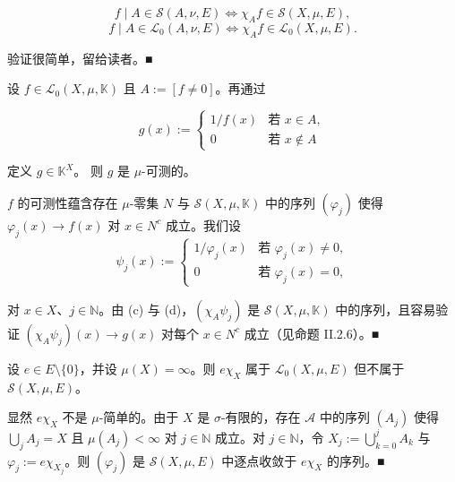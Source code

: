 \begin{remark}
\begin{items}
\[
f \mid A \in \mathcal{S}(A,\nu,E) \iff \chi_A f \in \mathcal{S}(X,\mu,E) ,
\]
\[
f \mid A \in \mathcal{L}_0(A,\nu,E) \iff \chi_A f \in \mathcal{L}_0(X,\mu,E) .
\]

\proofhead
验证很简单，留给读者。\nobreak\hspace{0.35em}■
\item

设 $ f \in \mathcal{L}_0(X,\mu,\mathbb{K}) $ 且 $ A := [f \neq 0] $。再通过

\begin{equation*}
g(x) := \begin{cases} 1/f(x) & \text{若 } x \in A , \\ 0 & \text{若 } x \notin A \end{cases}
\end{equation*}

定义 $ g \in \mathbb{K}^X $。
则 $ g $ 是 $ \mu $-可测的。

\proofhead
$ f $ 的可测性蕴含存在 $ \mu $-零集 $ N $ 与 $ \mathcal{S}(X,\mu,\mathbb{K}) $ 中的序列 $ (\varphi_j) $ 使得 $ \varphi_j(x) \to f(x) $ 对 $ x \in N^c $ 成立。我们设
\begin{equation*}
\psi_j(x) := \begin{cases} 1/\varphi_j(x) & \text{若 } \varphi_j(x) \neq 0 , \\ 0 & \text{若 } \varphi_j(x) = 0 , \end{cases}
\end{equation*}

对 $ x \in X $、$ j \in \mathbb{N} $。由 (c) 与 (d)，$ (\chi_A \psi_j) $ 是 $ \mathcal{S}(X,\mu,\mathbb{K}) $ 中的序列，且容易验证 $ (\chi_A \psi_j)(x) \to g(x) $ 对每个 $ x \in N^c $ 成立（见命题 II.2.6）。\nobreak\hspace{0.35em}■

\item

设 $ e \in E \setminus \{0\} $，并设 $ \mu(X) = \infty $。则 $ e\chi_X $ 属于 $ \mathcal{L}_0(X,\mu,E) $ 但不属于 $ \mathcal{S}(X,\mu,E) $。

\proofhead
显然 $ e\chi_X $ 不是 $ \mu $-简单的。由于 $ X $ 是 $ \sigma $-有限的，存在 $ \mathcal{A} $ 中的序列 $ (A_j) $ 使得 $ \bigcup_j A_j = X $ 且 $ \mu(A_j) < \infty $ 对 $ j \in \mathbb{N} $ 成立。对 $ j \in \mathbb{N} $，令 $ X_j := \bigcup_{k=0}^{j} A_k $ 与 $ \varphi_j := e\chi_{X_j} $。则 $ (\varphi_j) $ 是 $ \mathcal{S}(X,\mu,E) $ 中逐点收敛于 $ e\chi_X $ 的序列。\nobreak\hspace{0.35em}■
\end{items}

\end{remark}

